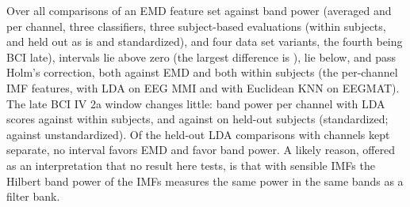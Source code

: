 Over all  comparisons of an EMD feature set against band power (averaged and per channel, three classifiers, three subject-based evaluations (within subjects, and held out as is and standardized), and four data set variants, the fourth being BCI late),  intervals lie above zero (the largest difference is ),  lie below, and  pass Holm's correction, both against EMD and both within subjects (the per-channel IMF features, with LDA on EEG MMI and with Euclidean KNN on EEGMAT). The late BCI IV 2a window changes little: band power per channel with LDA scores  against  within subjects, and  against  on held-out subjects (standardized;  against  unstandardized). Of the  held-out LDA comparisons with channels kept separate, no interval favors EMD and  favor band power. A likely reason, offered as an interpretation that no result here tests, is that with sensible IMFs the Hilbert band power of the IMFs measures the same power in the same bands as a filter bank.
